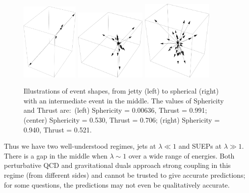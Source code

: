 \begin{figure}[t]\centering
\includegraphics[width=0.25\textwidth]{figures/DS_KKexample_event1.pdf}
\includegraphics[width=0.31\textwidth]{figures/DS_KKexample_event2.pdf}
\includegraphics[width=0.31\textwidth]{figures/DS_KKexample_event3.pdf}
\caption{Illustrations of event shapes, from jetty (left) to spherical (right) with an intermediate event in the middle. The values of Sphericity and Thrust are:~(left) Sphericity = 0.00636, Thrust = 0.991; (center) Sphericity = 0.530, Thrust = 0.706; (right)  Sphericity = 0.940, Thrust = 0.521. \label{fig:eventshapes}}
\end{figure}

Thus we have two well-understood regimes, jets at $\lambda \ll 1$ and SUEPs at $\lambda \gg 1$. There is a gap in the middle when $\lambda \sim 1$ over a wide range of energies. Both perturbative QCD and gravitational duals approach strong coupling in this regime (from different sides) and cannot be trusted to give accurate predictions; for some questions, the predictions may not even be qualitatively accurate.

